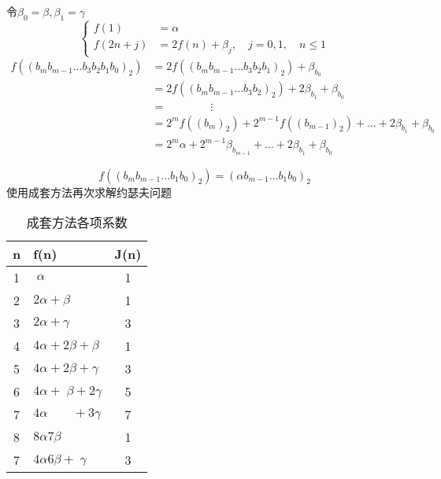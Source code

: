 令$ \beta_0 = \beta, \beta_1 = \gamma $
\begin{equation*}
	\left\{
	\begin{aligned}
		f(1)    &= \alpha  \\
		f(2n+j) &= 2f(n) + \beta_j, \quad j=0,1, \quad n\leqslant 1  
	\end{aligned}
	\right.
\end{equation*}
\begin{align*}
	    f((b_m b_{m-1}\dots b_3 b_2 b_1 b_0)_2) 
	&= 2f((b_m b_{m-1}\dots b_3 b_2 b_1)_2)     +  \beta_{b_0}  \\
	&= 2f((b_m b_{m-1}\dots b_3 b_2)_2)         + 2\beta_{b_1}+ \beta_{b_0}  \\
	&=\qquad\qquad\vdots\\
	&= 2^{m} f((b_{m})_2) + 2^{m-1} f((b_{m-1})_2) + \dots + 2\beta_{b_1}+ \beta_{b_0}  \\
	&= 2^{m} \alpha + 2^{m-1} \beta_{b_{m-1}} + \dots + 2\beta_{b_1}+ \beta_{b_0}  
\end{align*}

\begin{equation*}
    f((b_m b_{m-1}\dots b_1 b_0)_2) = (\alpha b_{m-1}\dots b_1 b_0)_2
\end{equation*}
使用成套方法再次求解约瑟夫问题
\begin{table}[htbp]
	\centering
	\small
	\caption{成套方法各项系数}
		\begin{tabular}{c|l c}
			\toprule
			n & f(n)                             & J(n)  \\
			\midrule
			1 & $ \;\alpha $                     & 1     \\
			2 & $ 2\alpha + \beta  $             & 1     \\
			3 & $ 2\alpha + \gamma $             & 3     \\ 
			4 & $ 4\alpha + 2\beta  + \beta $    & 1     \\ 
			5 & $ 4\alpha + 2\beta  + \gamma $   & 3     \\ 
			6 & $ 4\alpha + \;\beta + 2\gamma $  & 5     \\ 
			7 & $ 4\alpha \qquad + 3\gamma $     & 7     \\ 
			8 & $ 8\alpha 7\beta $               & 1     \\ 
			7 & $ 4\alpha 6\beta + \;\gamma $    & 3     \\ 
			\bottomrule
		\end{tabular}%
	\label{tab:fnLists002}%
\end{table}%

